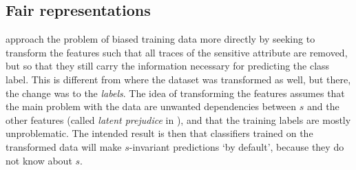 \subsection{Fair representations}\label{sec:fair-representation}
\citet{zemel2013learning} approach the problem of biased training data more directly
by seeking to transform the features such that all traces of the sensitive attribute are removed,
but so that they still carry the information necessary for predicting the class label.
This is different from \citet{kamiran2009classifying} where the dataset was transformed as well,
but there, the change was to the \emph{labels}.
The idea of transforming the features assumes that the main problem with the data
are unwanted dependencies between $s$ and the other features (called \emph{latent prejudice} in \citet{kamishima2012fairness}),
and that the training labels are mostly unproblematic.
The intended result is then that classifiers trained on the transformed data will make $s$-invariant predictions `by default',
because they do not know about $s$.

